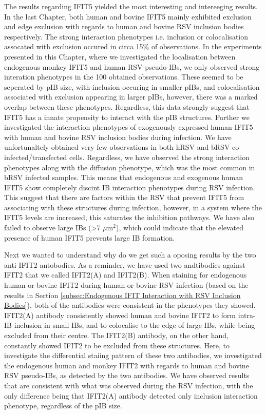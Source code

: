 The results regarding IFIT5 yielded the most interesting and intereeging results. In the last Chapter, both human and bovine IFIT5 mainly exhibited exclusion and edge exclusion with regards to human and bovine RSV inclusion bodies respectively. The strong interaction phenotypes i.e. inclusion or colocalisation assocated with exclusion occured in circa 15\% of observations. In the experiments presented in this Chapter, where we investigated the localisation between endogenous monkey IFIT5 and human RSV pseudo-IBs, we only observed strong interation phenotypes in the 100 obtained observations. These seemed to be seperated by pIB size, with inclusion occuring in smaller pIBs, and colocalisation associated with exclusion appearing in larger pIBs, however, there was a marked overlap between these phenotypes. Regardless, this data strongly suggest that IFIT5 has a innate propensity to interact with the pIB structures. Further we investigated the interaction phenotypes of exogenously expressed human IFIT5 with human and bovine RSV inclusion bodies during infection. We have unfortunaltely obtained very few observations in both hRSV and bRSV co-infected/transfected cells. Regardless, we have observed the strong interaction phenotypes along with the diffusion phenotype, which was the most common in bRSV infected samples. This means that endogenous and exogenous human IFIT5 show completely discint IB interaction phenotypes during RSV infection. This suggest that there are factors within the RSV that prevent IFIT5 from associating with these structures during infection, however, in a system where the IFIT5 levels are increased, this saturates the inhibition pathways. We have also failed to observe large IBs (>7 \(\mu \mbox{m}^2\)), which could indicate that the elevated presence of human IFIT5 prevents large IB formation. 

Next we wanted to understand why do we get such a oposing results by the two anti-IFIT2 antobodies. As a reminder, we have used two andtibodies against IFIT2 that we called IFIT2(A) and IFIT2(B). When staining for endogenous human or bovine IFIT2 during human or bovine RSV infection (based on the results in Section \ref{subsec:Endogenous IFIT Interaction with RSV Inclusion Bodies}), both of the antibodies were consistent in the phenotypes they showed. IFIT2(A) antibody consistently showed human and bovine IFIT2 to form intra-IB inclusion in small IBs, and to colocalise to the edge of large IBs, while being excluded from their centre. The IFIT2(B) antibody, on the other hand, constantly showed IFIT2 to be excluded from these structures. Here, to investigate the differential staiing pattern of these two antibodies, we investigated the endogenous human and monkey IFIT2 with regards to human and bovine RSV pseudo-IBs, as detected by the two antibodies. We have observed results that are consistent with what was observed during the RSV infection, with the only difference being that IFIT2(A) antibody detected only inclusion interaction phenotype, regardless of the pIB size.



